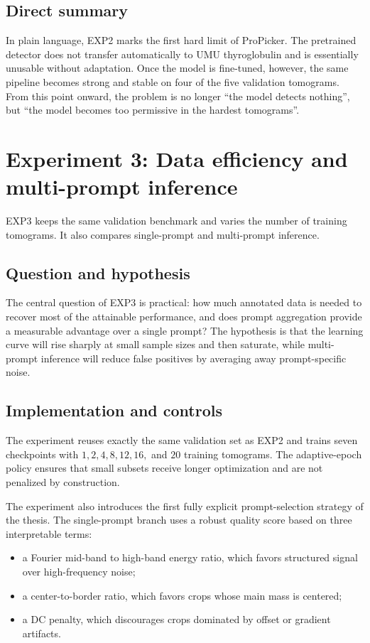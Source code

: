 \documentclass[12pt,a4paper]{report}
\begin{document}
\subsection{Direct summary}
In plain language, EXP2 marks the first hard limit of ProPicker. The pretrained detector does not transfer automatically to UMU thyroglobulin and is essentially unusable without adaptation. Once the model is fine-tuned, however, the same pipeline becomes strong and stable on four of the five validation tomograms. From this point onward, the problem is no longer \enquote{the model detects nothing}, but \enquote{the model becomes too permissive in the hardest tomograms}.

\section{Experiment 3: Data efficiency and multi-prompt inference}
EXP3 keeps the same validation benchmark and varies the number of training tomograms. It also compares single-prompt and multi-prompt inference.

\subsection{Question and hypothesis}
The central question of EXP3 is practical: how much annotated data is needed to recover most of the attainable performance, and does prompt aggregation provide a measurable advantage over a single prompt? The hypothesis is that the learning curve will rise sharply at small sample sizes and then saturate, while multi-prompt inference will reduce false positives by averaging away prompt-specific noise.

\subsection{Implementation and controls}
The experiment reuses exactly the same validation set as EXP2 and trains seven checkpoints with \(1, 2, 4, 8, 12, 16,\) and \(20\) training tomograms. The adaptive-epoch policy ensures that small subsets receive longer optimization and are not penalized by construction.

The experiment also introduces the first fully explicit prompt-selection strategy of the thesis. The single-prompt branch uses a robust quality score based on three interpretable terms:
\begin{itemize}
  \item a Fourier mid-band to high-band energy ratio, which favors structured signal over high-frequency noise;
  \item a center-to-border ratio, which favors crops whose main mass is centered;
  \item a DC penalty, which discourages crops dominated by offset or gradient artifacts.
\end{itemize}
\end{document}
